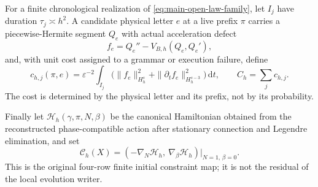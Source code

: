 \documentclass[11pt]{article}
\theoremstyle{definition}
\theoremstyle{remark}
\newcommand{\dd}{\mathrm d}
\begin{document}
For a finite chronological realization of \eqref{eq:main-open-law-family},
let $I_j$ have duration $\tau_j\asymp h^2$.  A candidate physical letter $e$
at a live prefix $\pi$ carries a piecewise-Hermite segment $Q_e$ with actual
acceleration defect
\begin{equation}
 f_e=Q_e''-V_{B,h}(Q_e,Q_e'),
 \label{eq:main-law-residual}
\end{equation}
and, with unit cost assigned to a grammar or execution failure, define
\begin{equation}
 c_{h,j}(\pi,e)=\varepsilon^{-2}
 \int_{I_j}\bigl(\|f_e\|_{H_h^s}^2
       +\|\partial_tf_e\|_{H_h^{s-3}}^2\bigr)\,\dd t,
 \qquad C_h=\sum_jc_{h,j}.
 \label{eq:main-law-cost}
\end{equation}
The cost is determined by the physical letter and its prefix, not by its
probability.

Finally let $\mathscr H_h(\gamma,\pi,N,\beta)$ be the canonical Hamiltonian
obtained from the reconstructed phase-compatible action after stationary
connection and Legendre elimination, and set
\begin{equation}
 \boxed{\mathscr C_h(X)=
 \left(-\nabla_N\mathscr H_h,\ \nabla_\beta\mathscr H_h\right)
       \big|_{N=1,\,\beta=0}.}
 \label{eq:main-action-initial-constraints}
\end{equation}
This is the original four-row finite initial constraint map; it is not the
residual of the local evolution writer.
\end{document}
